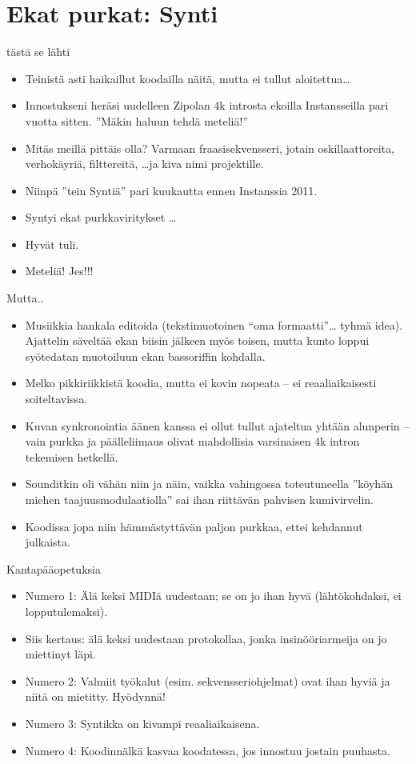 \documentclass{beamer}
\begin{document}
\section{Ekat purkat: Synti}
\begin{frame}{tästä se lähti}
\begin{itemize}
\item Teinistä asti haikaillut koodailla näitä, mutta ei tullut
  aloitettua\ldots
\item Innostukseni heräsi uudelleen Zipolan 4k introsta ekoilla
  Instansseilla pari vuotta sitten. ''Mäkin haluun tehdä meteliä!''
\item Mitäs meillä pittäis olla? Varmaan fraasisekvensseri, jotain
  oskillaattoreita, verhokäyriä, filttereitä, \ldots ja kiva nimi
  projektille.
\item Niinpä ''tein Syntiä'' pari kuukautta ennen Instanssia 2011.
\item Syntyi ekat purkkaviritykset \ldots
\item Hyvät tuli.
\item Meteliä! Jes!!!
\end{itemize}
\end{frame}


\begin{frame}{Mutta..}
\begin{itemize}
\item
  Musiikkia hankala editoida (tekstimuotoinen ``oma formaatti''\ldots
  tyhmä idea). Ajattelin säveltää ekan biisin jälkeen myös toisen,
  mutta kunto loppui syötedatan muotoiluun ekan bassoriffin kohdalla.
\item
  Melko pikkiriikkistä koodia, mutta ei kovin nopeata -- ei
  reaaliaikaisesti soiteltavissa.
\item
  Kuvan synkronointia äänen kanssa ei ollut tullut ajateltua yhtään
  alunperin -- vain purkka ja päälleliimaus olivat mahdollisia
  varsinaisen 4k intron tekemisen hetkellä.
\item
  Sounditkin oli vähän niin ja näin, vaikka vahingossa toteutuneella
  ''köyhän miehen taajuusmodulaatiolla'' sai ihan riittävän pahvisen
  kumivirvelin.
\item
  Koodissa jopa niin hämmästyttävän paljon purkkaa, ettei kehdannut
  julkaista.
\end{itemize}
\end{frame}


\begin{frame}{Kantapääopetuksia}
\begin{itemize}
\item
  Numero 1: Älä keksi MIDIä uudestaan; se on jo ihan hyvä
  (lähtökohdaksi, ei lopputulemaksi).
\item
  Siis kertaus: älä keksi uudestaan protokollaa, jonka
  insinööriarmeija on jo miettinyt läpi.
\item
  Numero 2: Valmiit työkalut (esim. sekvensseriohjelmat) ovat ihan
  hyviä ja niitä on mietitty. Hyödynnä!
\item
  Numero 3: Syntikka on kivampi reaaliaikaisena.
\item
  Numero 4: Koodinnälkä kasvaa koodatessa, jos innostuu jostain
  puuhasta.
\end{itemize}
\end{frame}
\end{document}
